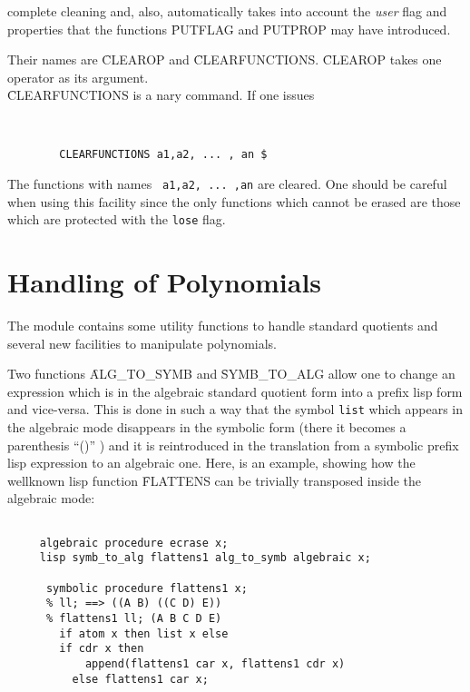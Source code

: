 complete cleaning and, also, automatically takes into account the
{\em user} flag and properties that the functions
\f{PUTFLAG} and \f{PUTPROP} may have introduced.


Their names are \f{CLEAROP} and \f{CLEARFUNCTIONS}.
\f{CLEAROP} takes one operator as its argument.\\
 \f{CLEARFUNCTIONS} is a nary command. If one issues


\begin{verbatim}


        CLEARFUNCTIONS a1,a2, ... , an $

\end{verbatim}
The functions with names \verb+ a1,a2, ... ,an+  are cleared.
One should be careful when  using this facility since the
only functions which cannot be erased are those which are
protected with the \verb+lose+ flag.
\ei
\section{Handling of Polynomials}
The module contains some utility functions to handle
standard quotients and several new facilities to manipulate polynomials.
\bi
\item[i.] Two functions \f{ALG\_TO\_SYMB} and \f{SYMB\_TO\_ALG}
allow one to change an expression which is in the algebraic standard
quotient form into a prefix lisp form and vice-versa. This is done
in such a way that the symbol \verb+list+ which appears in the
algebraic mode disappears in the symbolic form (there it becomes
a parenthesis ``()'' ) and it is reintroduced in the translation
from a symbolic prefix lisp expression  to an algebraic one.
Here, is an example, showing how the wellknown lisp function
\f{FLATTENS} can be trivially transposed inside the algebraic mode:
\begin{verbatim}

     algebraic procedure ecrase x;
     lisp symb_to_alg flattens1 alg_to_symb algebraic x;

      symbolic procedure flattens1 x;
      % ll; ==> ((A B) ((C D) E))
      % flattens1 ll; (A B C D E)
        if atom x then list x else
        if cdr x then
            append(flattens1 car x, flattens1 cdr x)
          else flattens1 car x;

\end{verbatim}


